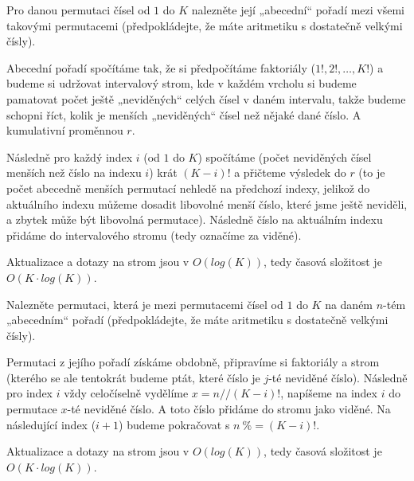 \documentclass[12pt]{article}                   %
\begin{document}
    \begin{priklad}[perm2n]
        Pro danou permutaci čísel od $1$ do $K$ nalezněte její „abecední“ pořadí mezi všemi takovými permutacemi (předpokládejte, že máte aritmetiku s dostatečně velkými čísly).

        \begin{reseni}
            Abecední pořadí spočítáme tak, že si předpočítáme faktoriály ($1!, 2!, …, K!$) a budeme si udržovat intervalový strom, kde v každém vrcholu si budeme pamatovat počet ještě „neviděných“ celých čísel v daném intervalu, takže budeme schopni říct, kolik je menších „neviděných“ čísel než nějaké dané číslo. A kumulativní proměnnou $r$.

            Následně pro každý index $i$ (od $1$ do $K$) spočítáme (počet neviděných čísel menších než číslo na indexu $i$) krát $(K-i)!$ a přičteme výsledek do $r$ (to je počet abecedně menších permutací nehledě na předchozí indexy, jelikož do aktuálního indexu můžeme dosadit libovolné menší číslo, které jsme ještě neviděli, a zbytek může být libovolná permutace). Následně číslo na aktuálním indexu přidáme do intervalového stromu (tedy označíme za viděné).

            Aktualizace a dotazy na strom jsou v $O(log(K))$, tedy časová složitost je $O(K·log(K))$.
        \end{reseni}
    \end{priklad}

    \begin{priklad}[n2perm]
        Nalezněte permutaci, která je mezi permutacemi čísel od $1$ do $K$ na daném $n$-tém „abecedním“ pořadí (předpokládejte, že máte aritmetiku s dostatečně velkými čísly).

        \begin{reseni}
            Permutaci z jejího pořadí získáme obdobně, připravíme si faktoriály a strom (kterého se ale tentokrát budeme ptát, které číslo je $j$-té neviděné číslo). Následně pro index $i$ vždy celočíselně vydělíme $x = n // (K-i)!$, napíšeme na index $i$ do permutace $x$-té neviděné číslo. A toto číslo přidáme do stromu jako viděné. Na následující index ($i+1$) budeme pokračovat s $n\ \%\!= (K-i)!$.

            Aktualizace a dotazy na strom jsou v $O(log(K))$, tedy časová složitost je $O(K·log(K))$.
        \end{reseni}
    \end{priklad}
\end{document}
